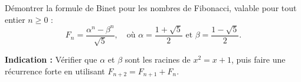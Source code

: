 Démontrer la formule de Binet pour les nombres de Fibonacci, valable pour tout entier $n \geq 0$ :
\[
F_n = \frac{\alpha^n - \beta^n}{\sqrt{5}}, \quad
\text{où } \alpha = \frac{1 + \sqrt{5}}{2} \text{ et } \beta = \frac{1 - \sqrt{5}}{2}.
\]

\textbf{Indication :} Vérifier que $\alpha$ et $\beta$ sont les racines de $x^2 = x + 1$, puis faire une récurrence forte en utilisant $F_{n+2} = F_{n+1} + F_n$.
